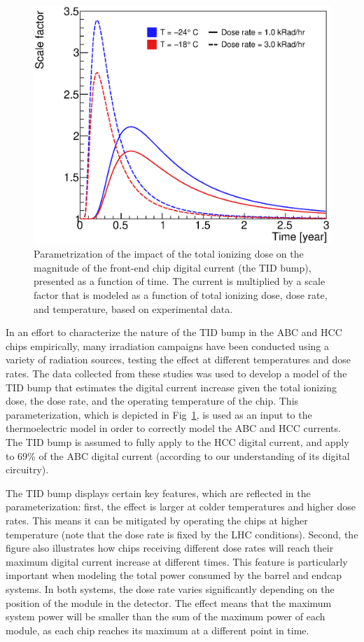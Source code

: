 \begin{figure}[ht]
\centering
\includegraphics[width=0.45\linewidth]{figures/AbcTidBumpVersionRatesAndTemps_Nominal.eps}
\caption{Parametrization of the impact of the total ionizing dose
on the magnitude of the front-end chip digital current (the TID bump), presented as a function of time.
The current is multiplied by a scale factor that is modeled as a function of total ionizing dose,
dose rate, and temperature, based on experimental data.
}
\label{tid_bump}
\end{figure}

In an effort to characterize the nature of the TID bump in the ABC and HCC chips empirically,
many irradiation campaigns have been conducted using a variety of radiation sources, testing
the effect at different temperatures and dose rates.
The data collected from these studies was used to develop a model of the TID bump
that estimates the digital current increase given the total ionizing dose, the dose rate,
and the operating temperature of the chip. This parameterization, which is depicted in
Fig~\ref{tid_bump}, is used as an input to the thermoelectric model in order to correctly model the
ABC and HCC currents. The TID bump is assumed to fully apply to the HCC digital current, and apply to
69\% of the ABC digital current (according to our understanding of its digital circuitry).

The TID bump displays certain key features, which are reflected in the parameterization:
first, the effect is larger at colder temperatures and higher dose rates. This means it can be
mitigated by operating the chips at higher temperature (note that the dose rate is fixed by the LHC conditions).
Second, the figure also illustrates how chips receiving different dose rates will reach their maximum
digital current increase at different times. This feature is particularly important when modeling the
total power consumed by the barrel and endcap systems. In both systems, the dose rate varies significantly
depending on the position of the module in the detector. The effect means that the maximum system
power will be smaller than the sum of the maximum power of each module, as each chip reaches
its maximum at a different point in time.

